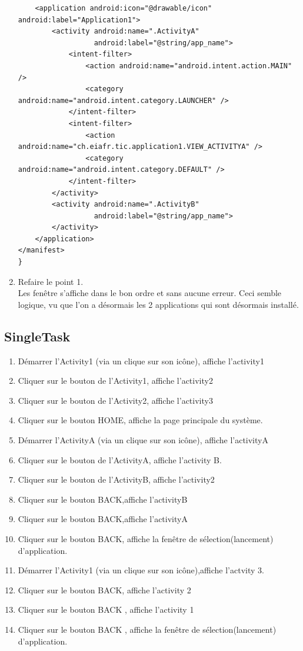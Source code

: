 \begin{enumerate}
\begin{lstlisting}
    <application android:icon="@drawable/icon" android:label="Application1">
        <activity android:name=".ActivityA"
                  android:label="@string/app_name">
            <intent-filter>
                <action android:name="android.intent.action.MAIN" />
                <category android:name="android.intent.category.LAUNCHER" />
            </intent-filter>
            <intent-filter>
                <action android:name="ch.eiafr.tic.application1.VIEW_ACTIVITYA" />
                <category android:name="android.intent.category.DEFAULT" />
            </intent-filter>
        </activity>
        <activity android:name=".ActivityB"
                  android:label="@string/app_name">
        </activity>
    </application>
</manifest>
}
\end{lstlisting}

\item Refaire le point 1. \\
Les fenêtre s'affiche dans le bon ordre et sans aucune erreur. Ceci semble logique, vu que l'on a désormais les 2 applications qui sont désormais installé. 
	\end{enumerate}


	\subsection{SingleTask}
			\begin{enumerate}
			\item Démarrer l'Activity1 (via un clique sur son icône), affiche l'activity1
			\item Cliquer sur le bouton de l’Activity1, affiche l'activity2
			\item Cliquer sur le bouton de l’Activity2, affiche l'activity3
			\item Cliquer sur le bouton HOME, affiche la page principale du système.
			\item Démarrer l'ActivityA (via un clique sur son icône), affiche l'activityA
			\item Cliquer sur le bouton de l’ActivityA, affiche l'activity B.
			\item  Cliquer sur le bouton de l’ActivityB, affiche l'activity2
			\item Cliquer sur le bouton BACK,affiche l'activityB
			\item Cliquer sur le bouton BACK,affiche l'activityA
			\item Cliquer sur le bouton BACK, affiche la fenêtre de sélection(lancement) d'application.
			\item Démarrer l'Activity1 (via un clique sur son icône),affiche l'actvity 3.
			\item Cliquer sur le bouton BACK, affiche l'activity 2
			\item Cliquer sur le bouton BACK , affiche l'activity 1
			\item Cliquer sur le bouton BACK , affiche la fenêtre de sélection(lancement) d'application.
			\end{enumerate}
			
